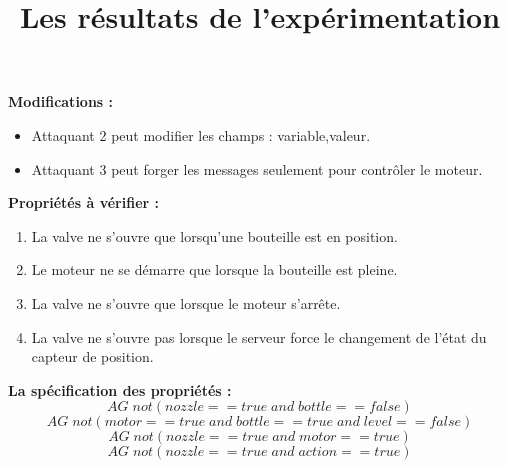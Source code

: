 \documentclass[10pt,a4paper]{article}
\author{}
\date{}
\title{Les résultats de l’expérimentation}
\begin{document}
\maketitle
\medskip
\textbf{Modifications :}
\begin{itemize}
\item Attaquant 2 peut modifier les champs : variable,valeur.
\item Attaquant 3 peut forger les messages seulement pour contrôler le moteur.\newline 
\end{itemize}

\textbf{Propriétés à vérifier :}
\begin{enumerate}
\item La valve ne s'ouvre que lorsqu'une bouteille est en position.
\item Le moteur ne se démarre que lorsque la bouteille est pleine.
\item La valve ne s'ouvre que lorsque le moteur s'arr\^{e}te.
\item La valve ne s'ouvre pas lorsque le serveur force le changement de l'état du capteur de position.
\end{enumerate}
\medskip

\textbf{La spécification des propriétés :}
\begin{equation}
AG\; not(nozzle==true\; and\; bottle==false)
\end{equation}
\begin{equation}
AG\; not(motor==true\; and\; bottle==true\; and\; level==false)
\end{equation}
\begin{equation}
AG\; not(nozzle==true \; and\; motor==true)
\end{equation}
\begin{equation}
AG\; not(nozzle==true \; and\; action==true)
\end{equation}
\end{document}
